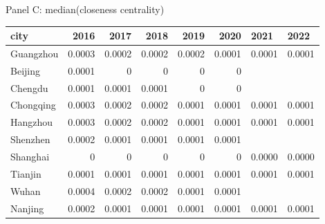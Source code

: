 \caption{Panel C: median(closeness centrality)}
\begin{tabular}{lrrrrrll}
\hline
 city      &   2016 &   2017 &   2018 &   2019 &   2020 & 2021   & 2022   \\
\hline
 Guangzhou & 0.0003 & 0.0002 & 0.0002 & 0.0002 & 0.0001 & 0.0001 & 0.0001 \\
 Beijing   & 0.0001 & 0      & 0      & 0      & 0      &        &        \\
 Chengdu   & 0.0001 & 0.0001 & 0.0001 & 0      & 0      &        &        \\
 Chongqing & 0.0003 & 0.0002 & 0.0002 & 0.0001 & 0.0001 & 0.0001 & 0.0001 \\
 Hangzhou  & 0.0003 & 0.0002 & 0.0002 & 0.0001 & 0.0001 & 0.0001 & 0.0001 \\
 Shenzhen  & 0.0002 & 0.0001 & 0.0001 & 0.0001 & 0.0001 &        &        \\
 Shanghai  & 0      & 0      & 0      & 0      & 0      & 0.0000 & 0.0000 \\
 Tianjin   & 0.0001 & 0.0001 & 0.0001 & 0.0001 & 0.0001 & 0.0001 & 0.0001 \\
 Wuhan     & 0.0004 & 0.0002 & 0.0002 & 0.0001 & 0.0001 &        &        \\
 Nanjing   & 0.0002 & 0.0001 & 0.0001 & 0.0001 & 0.0001 & 0.0001 & 0.0001 \\
\hline
\end{tabular}